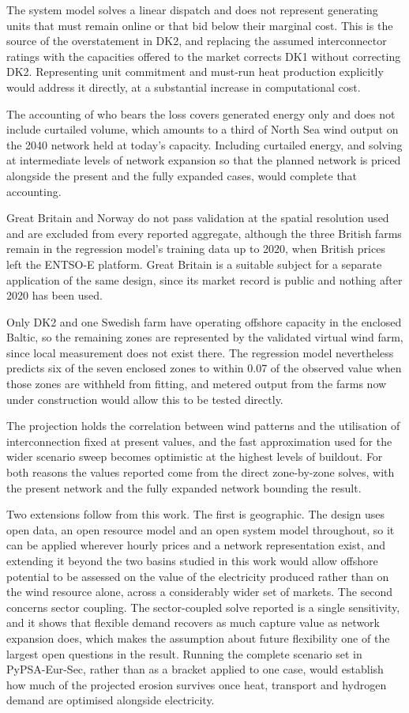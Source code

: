 The system model solves a linear dispatch and does not represent
generating units that must remain online or that bid below their marginal cost.
This is the source of the overstatement in DK2, and replacing the assumed
interconnector ratings with the capacities offered to the market corrects DK1
without correcting DK2. Representing unit commitment and must-run heat
production explicitly would address it directly, at a substantial increase in
computational cost.

The accounting of who bears the loss covers generated energy only and does not
include curtailed volume, which amounts to a third of North Sea wind output on
the 2040 network held at today's capacity. Including curtailed energy, and
solving at intermediate levels of network expansion so that the planned network
is priced alongside the present and the fully expanded cases, would complete
that accounting.

Great Britain and Norway do not pass validation at the spatial resolution used and are excluded from every reported aggregate, although the three British
farms remain in the regression model's training data up to 2020, when British
prices left the ENTSO-E platform. Great Britain is a suitable subject for a
separate application of the same design, since its market record is public and
nothing after 2020 has been used.

Only DK2 and one Swedish farm have operating offshore capacity in the enclosed
Baltic, so the remaining zones are represented by the validated virtual wind
farm, since local measurement does not exist there. The regression model nevertheless
predicts six of the seven enclosed zones to within 0.07 of the observed value
when those zones are withheld from fitting, and metered output from the farms
now under construction would allow this to be tested directly.

The projection holds the correlation between wind patterns and the utilisation
of interconnection fixed at present values, and the fast approximation used for
the wider scenario sweep becomes optimistic at the highest levels of buildout.
For both reasons the values reported come from the direct zone-by-zone solves,
with the present network and the fully expanded network bounding the result.

Two extensions follow from this work. The first is geographic. The design uses
open data, an open resource model and an open system model throughout, so it can
be applied wherever hourly prices and a network representation exist, and
extending it beyond the two basins studied in this work would allow offshore potential
to be assessed on the value of the electricity produced rather than on the wind
resource alone, across a considerably wider set of markets. The second concerns
sector coupling. The sector-coupled solve reported is a single sensitivity,
and it shows that flexible demand recovers as much capture value as network
expansion does, which makes the assumption about future flexibility one of the
largest open questions in the result. Running the complete scenario set in
PyPSA-Eur-Sec, rather than as a bracket applied to one case, would establish how
much of the projected erosion survives once heat, transport and hydrogen demand
are optimised alongside electricity.
